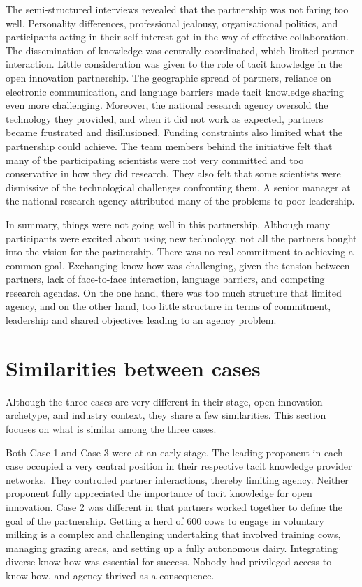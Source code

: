 The semi-structured interviews revealed that the partnership was not faring too well. Personality differences, professional jealousy, organisational politics, and participants acting in their self-interest got in the way of effective collaboration. The dissemination of knowledge was centrally coordinated, which limited partner interaction. Little consideration was given to the role of tacit knowledge in the open innovation partnership. The geographic spread of partners, reliance on electronic communication, and language barriers made tacit knowledge sharing even more challenging. Moreover, the national research agency oversold the technology they provided, and when it did not work as expected, partners became frustrated and disillusioned. Funding constraints also limited what the partnership could achieve. The team members behind the initiative felt that many of the participating scientists were not very committed and too conservative in how they did research. They also felt that some scientists were dismissive of the technological challenges confronting them. A senior manager at the national research agency attributed many of the problems to poor leadership. \medskip

In summary, things were not going well in this partnership. Although many participants were excited about using new technology, not all the partners bought into the vision for the partnership. There was no real commitment to achieving a common goal. Exchanging know-how was challenging, given the tension between partners, lack of face-to-face interaction, language barriers, and competing research agendas. On the one hand, there was too much structure that limited agency, and on the other hand, too little structure in terms of commitment, leadership and shared objectives leading to an agency problem.  

\section{Similarities between cases}

Although the three cases are very different in their stage, open innovation archetype, and industry context, they share a few similarities. This section focuses on what is similar among the three cases. \medskip

Both Case 1 and Case 3 were at an early stage. The leading proponent in each case occupied a very central position in their respective tacit knowledge provider networks. They controlled partner interactions, thereby limiting agency. Neither proponent fully appreciated the importance of tacit knowledge for open innovation. Case 2 was different in that partners worked together to define the goal of the partnership. Getting a herd of 600 cows to engage in voluntary milking is a complex and challenging undertaking that involved training cows, managing grazing areas, and setting up a fully autonomous dairy. Integrating diverse know-how was essential for success. Nobody had privileged access to know-how, and agency thrived as a consequence. \medskip

